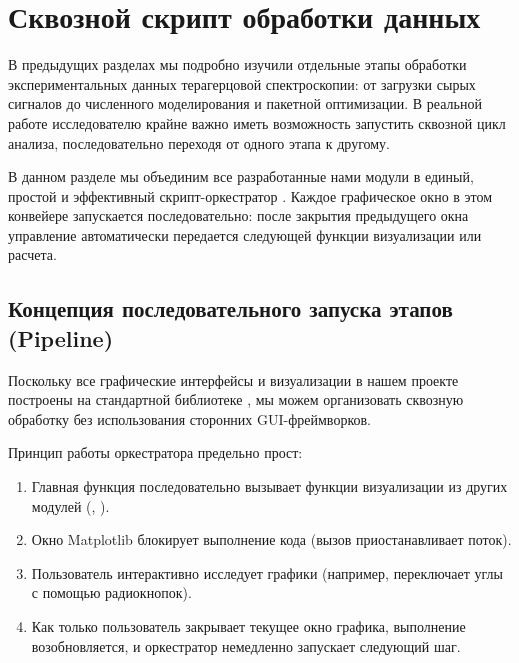 
\section{Сквозной скрипт обработки данных} \label{sec:integrated_app}

В предыдущих разделах мы подробно изучили отдельные этапы обработки экспериментальных данных терагерцовой спектроскопии: от загрузки сырых сигналов до численного моделирования и пакетной оптимизации. В реальной работе исследователю крайне важно иметь возможность запустить сквозной цикл анализа, последовательно переходя от одного этапа к другому.

В данном разделе мы объединим все разработанные нами модули в единый, простой и эффективный скрипт-оркестратор . Каждое графическое окно в этом конвейере запускается последовательно: после закрытия предыдущего окна управление автоматически передается следующей функции визуализации или расчета.

\subsection{Концепция последовательного запуска этапов (Pipeline)}

Поскольку все графические интерфейсы и визуализации в нашем проекте построены на стандартной библиотеке , мы можем организовать сквозную обработку без использования сторонних GUI-фреймворков.

Принцип работы оркестратора предельно прост:
\begin{enumerate}
    \item Главная функция  последовательно вызывает функции визуализации из других модулей (, ).
    \item Окно Matplotlib блокирует выполнение кода (вызов  приостанавливает поток).
    \item Пользователь интерактивно исследует графики (например, переключает углы с помощью радиокнопок).
    \item Как только пользователь закрывает текущее окно графика, выполнение возобновляется, и оркестратор немедленно запускает следующий шаг.
\end{enumerate}

